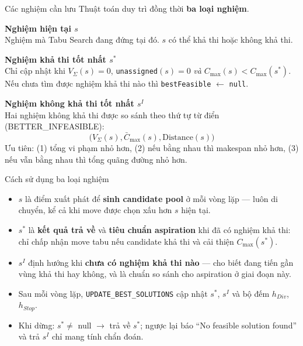 \documentclass[aspectratio=169]{beamer}
\newcommand{\hl}[1]{\textcolor{blue!60!black}{\textbf{#1}}}
\begin{document}
\begin{frame}{Các nghiệm cần lưu}
  \small Thuật toán duy trì đồng thời \hl{ba loại nghiệm}.

  \vspace{2mm}
  \textbf{Nghiệm hiện tại $s$}\\
  \small Nghiệm mà Tabu Search đang đứng tại đó. $s$ có thể khả thi hoặc không khả thi.

  \vspace{2mm}
  \textbf{Nghiệm khả thi tốt nhất $s^*$}\\
  \small Chỉ cập nhật khi $V_\Sigma(s) = 0$, \texttt{unassigned}$(s)=0$ \emph{và} $C_{\max}(s) < C_{\max}(s^*)$. Nếu chưa tìm được nghiệm khả thi nào thì \texttt{bestFeasible} $\leftarrow$ \texttt{null}.

  \vspace{2mm}
  \textbf{Nghiệm không khả thi tốt nhất $s^I$}\\
  \small Hai nghiệm không khả thi được so sánh theo thứ tự từ điển (BETTER\_INFEASIBLE):
  $$\big(V_\Sigma(s), \bar{C}_{\max}(s), \text{Distance}(s)\big)$$
  \small Ưu tiên: (1) tổng vi phạm nhỏ hơn, (2) nếu bằng nhau thì makespan nhỏ hơn, (3) nếu vẫn bằng nhau thì tổng quãng đường nhỏ hơn.
\end{frame}

\begin{frame}{Cách sử dụng ba loại nghiệm}
  \begin{itemize}
    \item $s$ là điểm xuất phát để \hl{sinh candidate pool} ở mỗi vòng lặp — luôn di chuyển, kể cả khi move được chọn xấu hơn $s$ hiện tại.
    \item $s^*$ là \hl{kết quả trả về} và \hl{tiêu chuẩn aspiration} khi đã có nghiệm khả thi: chỉ chấp nhận move tabu nếu candidate khả thi và cải thiện $C_{\max}(s^*)$.
    \item $s^I$ định hướng khi \hl{chưa có nghiệm khả thi nào} — cho biết đang tiến gần vùng khả thi hay không, và là chuẩn so sánh cho aspiration ở giai đoạn này.
    \item Sau mỗi vòng lặp, \texttt{UPDATE\_BEST\_SOLUTIONS} cập nhật $s^*$, $s^I$ và bộ đếm $h_{Div}$, $h_{Stop}$.
    \item Khi dừng: $s^* \ne$ null $\to$ trả về $s^*$; ngược lại báo ``No feasible solution found'' và trả $s^I$ chỉ mang tính chẩn đoán.
  \end{itemize}
\end{frame}

\end{document}
